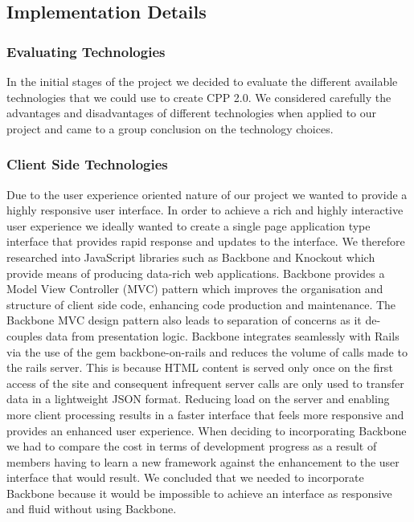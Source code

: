 \subsection{Implementation Details}

	\subsubsection{Evaluating Technologies}
		In the initial stages of the project we decided to evaluate the different available technologies that we could use to create CPP 2.0. We considered carefully the advantages and disadvantages of different technologies when applied to our project and came to a group conclusion on the technology choices.

	\subsubsection{Client Side Technologies}
		Due to the user experience oriented nature of our project we wanted to provide a highly responsive user interface. 
		In order to achieve a rich and highly interactive user experience we ideally wanted to create a single page application type interface that provides rapid response and updates to the interface. We therefore researched into JavaScript libraries such as Backbone and Knockout which provide means of producing data-rich web applications.  
		Backbone provides a Model View Controller (MVC) pattern which improves the organisation and structure of client side code, enhancing code production and maintenance. The Backbone MVC design pattern also leads to separation of concerns as it de-couples data from presentation logic. Backbone integrates seamlessly with Rails via the use of the gem backbone-on-rails and reduces the volume of calls made to the rails server. This is because HTML content is served only once on the first access of the site and consequent infrequent server calls are only used to transfer data in a lightweight JSON format. Reducing load on the server and enabling more client processing results in a faster interface that feels more responsive and provides an enhanced user experience.
		When deciding to incorporating Backbone we had to compare the cost in terms of development progress as a result of members having to learn a new framework against the enhancement to the user interface that would result. We concluded that we needed to incorporate Backbone because it would be impossible to achieve an interface as responsive and fluid without using Backbone.

